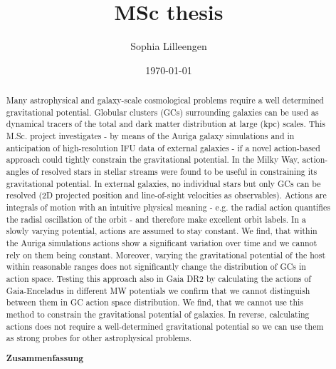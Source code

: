 \documentclass[a4paper,12pt,abstracton, twoside]{scrartcl}
\title{MSc thesis}
\author{Sophia Lilleengen}
\date{\today}
\begin{document}
 
\renewcommand{\bibname}{Bibliography}



\newpage
\thispagestyle{empty}
\begin{abstract}
\hspace{-12pt}Many astrophysical and galaxy-scale cosmological problems require a well determined gravitational potential. Globular clusters (GCs) surrounding galaxies can be used as dynamical tracers of the total and dark matter distribution at large (kpc) scales. This M.Sc. project investigates - by means of the Auriga galaxy simulations and in anticipation of high-resolution IFU data of external galaxies - if a novel action-based approach could tightly constrain the gravitational potential. In the Milky Way, action-angles of resolved stars in stellar streams were found to be useful in constraining its gravitational potential. In external galaxies, no individual stars but only GCs can be resolved (2D projected position and line-of-sight velocities as observables). Actions are integrals of motion with an intuitive physical meaning - e.g. the radial action quantifies the radial oscillation of the orbit - and therefore make excellent orbit labels. In a slowly varying potential, actions are assumed to stay constant. We find, that within the Auriga simulations actions show a significant variation over time and we cannot rely on them being constant. Moreover, varying the gravitational potential of the host within reasonable ranges does not significantly change the distribution of GCs in action space. Testing this approach also in Gaia DR2 by calculating the actions of Gaia-Enceladus in different MW potentials we confirm that we cannot distinguish between them in GC action space distribution. We find, that we cannot use this method to constrain the gravitational potential of galaxies. In reverse, calculating actions does not require a well-determined gravitational potential so we can use them as strong probes for other astrophysical problems. 

\begin{center}
 \textbf{Zusammenfassung}\end{center}

\hspace{-12pt}\blindtext

\end{abstract}

\newpage
\fancyhf{}
\fancyhead{}
\fancyfoot{}
\fancyfoot[LE,RO]{\thepage}
\fancyfoot[LO,RE]{}
\end{document}
